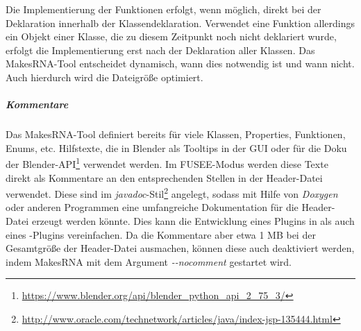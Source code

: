 Die Implementierung der Funktionen erfolgt, wenn möglich, direkt bei der Deklaration innerhalb der Klassendeklaration. Verwendet eine Funktion allerdings ein Objekt einer Klasse, die zu diesem Zeitpunkt noch nicht deklariert wurde, erfolgt die Implementierung erst nach der Deklaration aller Klassen. Das MakesRNA-Tool entscheidet dynamisch, wann dies notwendig ist und wann nicht. Auch hierdurch wird die Dateigröße optimiert.
 
\subparagraph{Kommentare}
\label{sec:comments}

Das MakesRNA-Tool definiert bereits für viele Klassen, Properties, Funktionen, Enums, etc. Hilfstexte, die in Blender als Tooltips in der GUI oder für die Doku der Blender-API\footnote{\url{https://www.blender.org/api/blender_python_api_2_75_3/}} verwendet werden. Im FUSEE-Modus werden diese Texte direkt als Kommentare an den entsprechenden Stellen in der Header-Datei verwendet. Diese sind im \emph{javadoc}-Stil\footnote{\url{http://www.oracle.com/technetwork/articles/java/index-jsp-135444.html}} angelegt, sodass mit Hilfe von \emph{Doxygen} oder anderen Programmen eine umfangreiche Dokumentation für die Header-Datei erzeugt werden könnte. Dies kann die Entwicklung eines Plugins in \CS als auch eines \CC-Plugins vereinfachen. Da die Kommentare aber etwa 1 MB bei der Gesamtgröße der Header-Datei ausmachen, können diese auch deaktiviert werden, indem MakesRNA mit dem Argument \emph{-{}-nocomment} gestartet wird.

\newpage